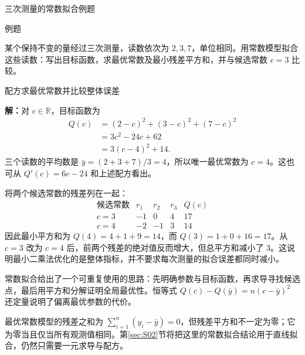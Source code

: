 \documentclass[aspectratio=169,10pt,fontset=fandol]{ctexbeamer}
\begin{document}
\begin{frame}[t,fragile]{三次测量的常数拟合例题}
\normalsize
\begin{block}{例题}
{\normalsize
某个保持不变的量经过三次测量，读数依次为 $2,3,7$，单位相同。用常数模型拟合这些读数：写出目标函数，求最优常数及最小残差平方和，并与候选常数 $c=3$ 比较。

}
\end{block}
\end{frame}
\begin{frame}[t,fragile]{配方求最优常数并比较整体误差}
\footnotesize
{\footnotesize
\par\noindent\textbf{解：}对 $c\in\mathbb{R}$，目标函数为
\[
\begin{aligned}
Q(c)&=(2-c)^2+(3-c)^2+(7-c)^2\\
&=3c^2-24c+62\\
&=3(c-4)^2+14.
\end{aligned}
\]
三个读数的平均数是 $\bar{y}=(2+3+7)/3=4$，所以唯一最优常数为 $c=4$。这也可从 $Q'(c)=6c-24$ 和上述配方看出。


}
{\footnotesize
将两个候选常数的残差列在一起：
\[
\begin{array}{c|rrr|r}
\text{候选常数}&r_1&r_2&r_3&Q(c)\\ \hline
c=3&-1&0&4&17\\
c=4&-2&-1&3&14
\end{array}
\]
因此最小平方和为 $Q(4)=4+1+9=14$，而 $Q(3)=1+0+16=17$。从 $c=3$ 改为 $c=4$ 后，前两个残差的绝对值反而增大，但总平方和减小了 $3$。这说明最小二乘法优化的是整体指标，并不要求每次测量的拟合误差都同时减小。\par

}
{\footnotesize
常数拟合给出了一个可重复使用的思路：先明确参数与目标函数，再求导寻找候选点，最后用平方和分解证明全局最优性。恒等式 $Q(c)-Q(\bar{y})=n(c-\bar{y})^2$ 还定量说明了偏离最优参数的代价。


}
{\footnotesize
最优常数模型的残差之和为 $\sum_{i=1}^{n}(y_i-\bar{y})=0$，但残差平方和不一定为零；它为零当且仅当所有观测值相同。第\ref{sec:S02}节将把这里的常数拟合结论用于直线拟合，仍然只需要一元求导与配方。\par

}
\end{frame}
\end{document}
